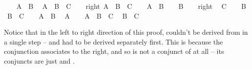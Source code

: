 \begin{isabellebody}
\isanewline
\ \ \isamarkupfalse%
\ {\isacharbackquoteopen}A\ {\isasymand}\ B{\isacharbackquoteclose}\ \isamarkupfalse%
\ {\isachardoublequoteopen}{\isacharparenleft}A\ {\isasymand}\ B{\isacharparenright}\ {\isasymand}\ C{\isachardoublequoteclose}\isacommand{{\isachardot}{\isachardot}}\isamarkupfalse%
\isanewline
{}\isamarkupfalse%
\isanewline
\ \ \isamarkupfalse%
\ right{\isacharcolon}\ {\isachardoublequoteopen}{\isacharparenleft}A\ {\isasymand}\ B{\isacharparenright}\ {\isasymand}\ C{\isachardoublequoteclose}\isanewline
\ \ \isamarkupfalse%
\ {\isachardoublequoteopen}A\ {\isasymand}\ B{\isachardoublequoteclose}\isacommand{{\isachardot}{\isachardot}}\isamarkupfalse%
\isanewline
\ \ \isamarkupfalse%
\ {\isachardoublequoteopen}B{\isachardoublequoteclose}\isacommand{{\isachardot}{\isachardot}}\isamarkupfalse%
\isanewline
\ \ \isamarkupfalse%
\ right\ \isamarkupfalse%
\ {\isachardoublequoteopen}C{\isachardoublequoteclose}\isacommand{{\isachardot}{\isachardot}}\isamarkupfalse%
\isanewline
\ \ \isamarkupfalse%
\ {\isacharbackquoteopen}B{\isacharbackquoteclose}\ \isamarkupfalse%
\ {\isachardoublequoteopen}B\ {\isasymand}\ C{\isachardoublequoteclose}\isacommand{{\isachardot}{\isachardot}}\isamarkupfalse%
\isanewline
\ \ \isamarkupfalse%
\ {\isacharbackquoteopen}A\ {\isasymand}\ B{\isacharbackquoteclose}\ \isamarkupfalse%
\ {\isachardoublequoteopen}A{\isachardoublequoteclose}\isacommand{{\isachardot}{\isachardot}}\isamarkupfalse%
\isanewline
\ \ \isamarkupfalse%
\ {\isachardoublequoteopen}A\ {\isasymand}\ B\ {\isasymand}\ C{\isachardoublequoteclose}\ \isamarkupfalse%
\ {\isacharbackquoteopen}B\ {\isasymand}\ C{\isacharbackquoteclose}\isacommand{{\isachardot}{\isachardot}}\isamarkupfalse%
\isanewline
{}\isamarkupfalse%
%
\endisatagproof
{\isafoldproof}%
%
\isadelimproof
%
\endisadelimproof
%
\begin{isamarkuptext}%
Notice that in the left to right direction of this proof,  couldn't be derived
from  in a single step --  and  had to be derived separately
first. This is because the conjunction associates to the right, and so  is not a conjunct
of  at all -- its conjuncts are just  and .%
\end{isamarkuptext}\isamarkuptrue%

\end{isabellebody}
